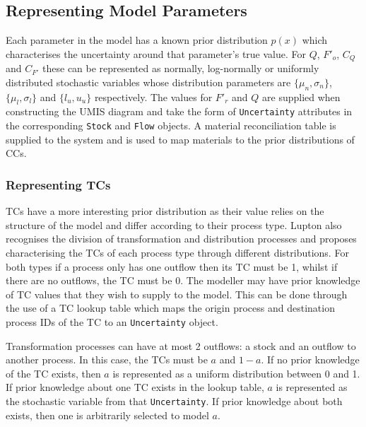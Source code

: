\documentclass[ %
                    author={Tom Jager},
                supervisor={Dr. Daniel Schien},
                    degree={MEng},
                     title={A Bayesian Inference Engine for UMIS Structured Data},
                  subtitle={},
                      type={research},
                      year={2019} ]{dissertation}
\begin{document}
\subsection{Representing Model Parameters}
Each parameter in the model has a known prior distribution $p(x)$ which characterises the uncertainty around that parameter's true value. For $Q$, $F'_o$, $C_{Q}$ and $C_{F'}$ these can be represented as normally, log-normally or uniformly distributed stochastic variables whose distribution parameters are $\{\mu_n, \sigma_n\}$, $\{\mu_l, \sigma_l\}$ and $\{l_u, u_u\}$ respectively. The values for $F'_r$ and $Q$ are supplied when constructing the UMIS diagram and take the form of \texttt{Uncertainty} attributes in the corresponding \texttt{Stock} and \texttt{Flow} objects. A material reconciliation table is supplied to the system and is used to map materials to the prior distributions of CCs.

\subsubsection{Representing TCs}
\label{sec:representing_tcs}
TCs have a more interesting prior distribution as their value relies on the structure of the model and differ according to their process type. Lupton also recognises the division of transformation and distribution processes and proposes characterising the TCs of each process type through different distributions. For both types if a process only has one outflow then its TC must be 1, whilst if there are no outflows, the TC must be 0. The modeller may have prior knowledge of TC values that they wish to supply to the model. This can be done through the use of a TC lookup table which maps the origin process and destination process IDs of the TC to an \texttt{Uncertainty} object. 

Transformation processes can have at most 2 outflows: a stock and an outflow to another process. In this case, the TCs must be $a$ and $1-a$. If no prior knowledge of the TC exists, then $a$ is represented as a uniform distribution between 0 and 1. If prior knowledge about one TC exists in the lookup table, $a$ is represented as the stochastic variable from that \texttt{Uncertainty}. If prior knowledge about both exists, then one is arbitrarily selected to model $a$.
\end{document}
